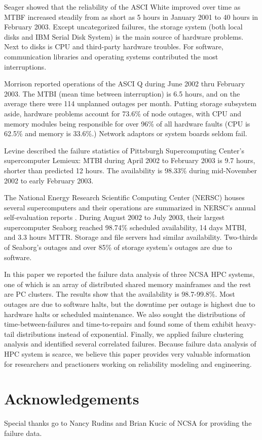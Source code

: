 \documentclass[10pt,twocolumn]{article}
\begin{document}
Seager \cite{Seager:03} showed that the reliability of the 
ASCI White improved over time as MTBF increased steadily from 
as short as 5 hours in January 2001 to 40 hours in February 
2003. Except uncategorized failures, the storage system 
(both local disks and IBM Serial Disk System) 
is the main source of hardware problems. Next to disks is 
CPU and third-party hardware troubles. For software, 
communication libraries and operating systems contributed
the most interruptions.

Morrison \cite{Morrison:03} reported operations of the
ASCI Q during June 2002 thru February 2003. The MTBI 
(mean time between interruption) is 6.5 hours, and on 
the average there were 114 unplanned outages per month. 
Putting storage subsystem aside, hardware problems account 
for 73.6\% of node outages, with CPU and memory modules 
being responsible for over 96\% of all hardware faults 
(CPU is 62.5\% and memory is 33.6\%.) Network adaptors or 
system boards seldom fail. 

Levine \cite{Levine:03} described the failure statistics of 
Pittsburgh Supercomputing Center's supercomputer Lemieux: MTBI 
during April 2002 to February 2003 is 9.7 hours, shorter than 
predicted 12 hours. The availability is 98.33\% during 
mid-November 2002 to early February 2003.

The National Energy Research Scientific Computing Center 
(NERSC) houses several supercomputers and their operations 
are summarized in NERSC's annual self-evaluation reports 
\cite{NERSC02}. During August 2002 to July 2003, their 
largest supercomputer Seaborg reached 98.74\% scheduled 
availability, 14 days MTBI, and 3.3 hours MTTR. Storage 
and file servers had similar availability. Two-thirds 
of Seaborg's outages and over 85\% of storage system's 
outages are due to software.

\label{s:concl}
In this paper we reported the failure data analysis of
three NCSA HPC systems, one of which is an array of
distributed shared memory mainframes and the rest are
PC clusters. The results show that the availability 
is 98.7-99.8\%. Most outages are due to software halts, 
but the downtime per outage is highest due to 
hardware halts or scheduled maintenance.
We also sought the distributions of time-between-failures
and time-to-repairs and found some of them exhibit 
heavy-tail distributions instead of exponential. 
Finally, we applied failure clustering analysis and identified
several correlated failures. Because failure data
analysis of HPC system is scarce, we believe this paper 
provides very valuable information for researchers and 
practioners working on reliability modeling and engineering.

\section*{Acknowledgements}
Special thanks go to Nancy Rudins and Brian Kucic of NCSA
for providing the failure data.



\end{document}
